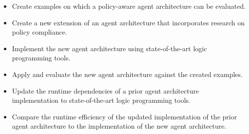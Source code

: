 \begin{itemize}
    \item Create examples on which a policy-aware agent architecture can be evaluated.
    \item Create a new extension of an agent architecture that incorporates research on policy compliance.
    \item Implement the new agent architecture using state-of-the-art logic programming tools.
    \item Apply and evaluate the new agent architecture against the created examples.
    \item Update the runtime dependencies of a prior agent architecture implementation to state-of-the-art logic programming tools.
    \item Compare the runtime efficiency of the updated implementation of the prior agent architecture to the implementation of the new agent architecture.
\end{itemize}
